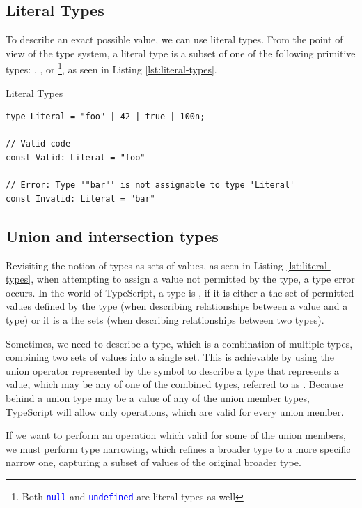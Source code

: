 \subsection{Literal Types}

To describe an exact possible value, we can use literal types. From the point of view of the type system, a literal type is a subset of one of the following primitive types: , ,  or \footnote{Both \texttt{\textcolor{blue}{null}} and \texttt{\textcolor{blue}{undefined}} are literal types as well}, as seen in Listing \ref{lst:literal-types}.

\begin{listing}[h]
  \caption{Literal Types}\label{lst:literal-types}
  \begin{verbatim}
type Literal = "foo" | 42 | true | 100n;

// Valid code
const Valid: Literal = "foo"

// Error: Type '"bar"' is not assignable to type 'Literal'
const Invalid: Literal = "bar" 
\end{verbatim}
\end{listing}

\subsection{Union and intersection types}

Revisiting the notion of types as sets of values, as seen in Listing \ref{lst:literal-types}, when attempting to assign a value not permitted by the  type, a type error occurs. In the world of TypeScript, a type is , if it is either a  the set of permitted values defined by the type (when describing relationships between a value and a type) or it is a  the sets (when describing relationships between two types).

Sometimes, we need to describe a type, which is a combination of multiple types, combining two sets of values into a single set. This is achievable by using the union operator represented by the \code{|} symbol to describe a type that represents a value, which may be any of one of the combined types, referred to as  \cite{DocumentationEverydayTypes}. Because behind a union type may be a value of any of the union member types, TypeScript will allow only operations, which are valid for every union member.

If we want to perform an operation which valid for some of the union members, we must perform type narrowing, which refines a broader type to a more specific narrow one, capturing a subset of values of the original broader type.

